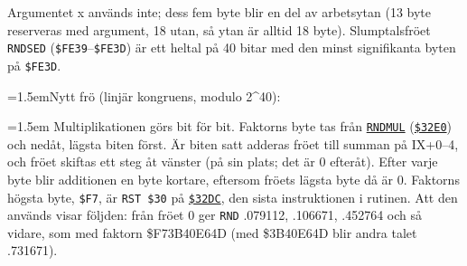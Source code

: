 \begin{Listing}
\Gap
{}
\begin{Note}\par\noindent Argumentet x används inte; dess fem byte blir en del av arbetsytan (13 byte reserveras med argument, 18 utan, så ytan är alltid 18 byte). Slumptalsfröet \texttt{RNDSED} (\texttt{\$FE39}–\texttt{\$FE3D}) är ett heltal på 40 bitar med den minst signifikanta byten på \texttt{\$FE3D}.\par
\par\noindent\hangindent=1.5emNytt frö (linjär kongruens, modulo 2\^{}40):\par
\begin{Verb}
\end{Verb}
\par\noindent\hangindent=1.5em Multiplikationen görs bit för bit. Faktorns byte tas från \hyperlink{l:RNDMUL}{\texttt{RNDMUL}} (\hyperlink{a:32E0}{\texttt{\$32E0}}) och nedåt, lägsta biten först. Är biten satt adderas fröet till summan på IX+0–4, och fröet skiftas ett steg åt vänster (på sin plats; det är 0 efteråt). Efter varje byte blir additionen en byte kortare, eftersom fröets lägsta byte då är 0. Faktorns högsta byte, \texttt{\$F7}, är \texttt{RST \$30} på \hyperlink{a:32DC}{\texttt{\$32DC}}, den sista instruktionen i rutinen. Att den används visar följden: från fröet 0 ger \texttt{RND} .079112, .106671, .452764 och så vidare, som med faktorn \$F73B40E64D (med \$3B40E64D blir andra talet .731671).\par

\end{Note}
\end{Listing}
